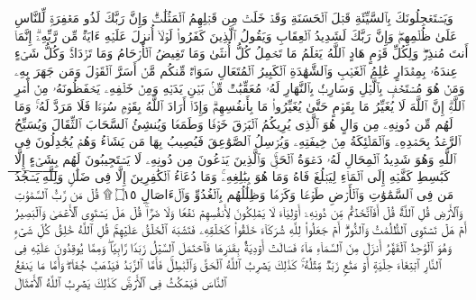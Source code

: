 وَیَسۡتَعۡجِلُونَكَ بِٱلسَّیِّئَةِ قَبۡلَ ٱلۡحَسَنَةِ وَقَدۡ خَلَتۡ مِن قَبۡلِهِمُ ٱلۡمَثُلَٰتُۗ وَإِنَّ رَبَّكَ لَذُو مَغۡفِرَةࣲ لِّلنَّاسِ عَلَىٰ ظُلۡمِهِمۡۖ وَإِنَّ رَبَّكَ لَشَدِیدُ ٱلۡعِقَابِ%
\stopbuffer
\startbuffer[\q:13:7]
وَیَقُولُ ٱلَّذِینَ كَفَرُوا۟ لَوۡلَاۤ أُنزِلَ عَلَیۡهِ ءَایَةࣱ مِّن رَّبِّهِۦۤۗ إِنَّمَاۤ أَنتَ مُنذِرࣱۖ وَلِكُلِّ قَوۡمٍ هَادٍ%
\stopbuffer
\startbuffer[\q:13:8]
ٱللَّهُ یَعۡلَمُ مَا تَحۡمِلُ كُلُّ أُنثَىٰ وَمَا تَغِیضُ ٱلۡأَرۡحَامُ وَمَا تَزۡدَادُۚ وَكُلُّ شَیۡءٍ عِندَهُۥ بِمِقۡدَارٍ%
\stopbuffer
\startbuffer[\q:13:9]
عَٰلِمُ ٱلۡغَیۡبِ وَٱلشَّهَٰدَةِ ٱلۡكَبِیرُ ٱلۡمُتَعَالِ%
\stopbuffer
\startbuffer[\q:13:10]
سَوَاۤءࣱ مِّنكُم مَّنۡ أَسَرَّ ٱلۡقَوۡلَ وَمَن جَهَرَ بِهِۦ وَمَنۡ هُوَ مُسۡتَخۡفِۭ بِٱلَّیۡلِ وَسَارِبُۢ بِٱلنَّهَارِ%
\stopbuffer
\startbuffer[\q:13:11]
لَهُۥ مُعَقِّبَٰتࣱ مِّنۢ بَیۡنِ یَدَیۡهِ وَمِنۡ خَلۡفِهِۦ یَحۡفَظُونَهُۥ مِنۡ أَمۡرِ ٱللَّهِۗ إِنَّ ٱللَّهَ لَا یُغَیِّرُ مَا بِقَوۡمٍ حَتَّىٰ یُغَیِّرُوا۟ مَا بِأَنفُسِهِمۡۗ وَإِذَاۤ أَرَادَ ٱللَّهُ بِقَوۡمࣲ سُوۤءࣰا فَلَا مَرَدَّ لَهُۥۚ وَمَا لَهُم مِّن دُونِهِۦ مِن وَالٍ%
\stopbuffer
\startbuffer[\q:13:12]
هُوَ ٱلَّذِی یُرِیكُمُ ٱلۡبَرۡقَ خَوۡفࣰا وَطَمَعࣰا وَیُنشِئُ ٱلسَّحَابَ ٱلثِّقَالَ%
\stopbuffer
\startbuffer[\q:13:13]
وَیُسَبِّحُ ٱلرَّعۡدُ بِحَمۡدِهِۦ وَٱلۡمَلَٰۤئِكَةُ مِنۡ خِیفَتِهِۦ وَیُرۡسِلُ ٱلصَّوَٰعِقَ فَیُصِیبُ بِهَا مَن یَشَاۤءُ وَهُمۡ یُجَٰدِلُونَ فِی ٱللَّهِ وَهُوَ شَدِیدُ ٱلۡمِحَالِ%
\stopbuffer
\startbuffer[\q:13:14]
لَهُۥ دَعۡوَةُ ٱلۡحَقِّۚ وَٱلَّذِینَ یَدۡعُونَ مِن دُونِهِۦ لَا یَسۡتَجِیبُونَ لَهُم بِشَیۡءٍ إِلَّا كَبَٰسِطِ كَفَّیۡهِ إِلَى ٱلۡمَاۤءِ لِیَبۡلُغَ فَاهُ وَمَا هُوَ بِبَٰلِغِهِۦۚ وَمَا دُعَاۤءُ ٱلۡكَٰفِرِینَ إِلَّا فِی ضَلَٰلࣲ%
\stopbuffer
\startbuffer[\q:13:15]
وَ̅لِ̅لَّ̅هِ̅ ̅یَ̅سۡ̅جُ̅دُ̅ مَن فِی ٱلسَّمَٰوَٰتِ وَٱلۡأَرۡضِ طَوۡعࣰا وَكَرۡهࣰا وَظِلَٰلُهُم بِٱلۡغُدُوِّ وَٱلۡءَاصَالِ ۝١٥ ۩%
\stopbuffer
\startbuffer[\q:13:16]
قُلۡ مَن رَّبُّ ٱلسَّمَٰوَٰتِ وَٱلۡأَرۡضِ قُلِ ٱللَّهُۚ قُلۡ أَفَٱتَّخَذۡتُم مِّن دُونِهِۦۤ أَوۡلِیَاۤءَ لَا یَمۡلِكُونَ لِأَنفُسِهِمۡ نَفۡعࣰا وَلَا ضَرࣰّاۚ قُلۡ هَلۡ یَسۡتَوِی ٱلۡأَعۡمَىٰ وَٱلۡبَصِیرُ أَمۡ هَلۡ تَسۡتَوِی ٱلظُّلُمَٰتُ وَٱلنُّورُۗ أَمۡ جَعَلُوا۟ لِلَّهِ شُرَكَاۤءَ خَلَقُوا۟ كَخَلۡقِهِۦ فَتَشَٰبَهَ ٱلۡخَلۡقُ عَلَیۡهِمۡۚ قُلِ ٱللَّهُ خَٰلِقُ كُلِّ شَیۡءࣲ وَهُوَ ٱلۡوَٰحِدُ ٱلۡقَهَّٰرُ%
\stopbuffer
\startbuffer[\q:13:17]
أَنزَلَ مِنَ ٱلسَّمَاۤءِ مَاۤءࣰ فَسَالَتۡ أَوۡدِیَةُۢ بِقَدَرِهَا فَٱحۡتَمَلَ ٱلسَّیۡلُ زَبَدࣰا رَّابِیࣰاۖ وَمِمَّا یُوقِدُونَ عَلَیۡهِ فِی ٱلنَّارِ ٱبۡتِغَاۤءَ حِلۡیَةٍ أَوۡ مَتَٰعࣲ زَبَدࣱ مِّثۡلُهُۥۚ كَذَٰلِكَ یَضۡرِبُ ٱللَّهُ ٱلۡحَقَّ وَٱلۡبَٰطِلَۚ فَأَمَّا ٱلزَّبَدُ فَیَذۡهَبُ جُفَاۤءࣰۖ وَأَمَّا مَا یَنفَعُ ٱلنَّاسَ فَیَمۡكُثُ فِی ٱلۡأَرۡضِۚ كَذَٰلِكَ یَضۡرِبُ ٱللَّهُ ٱلۡأَمۡثَالَ%
